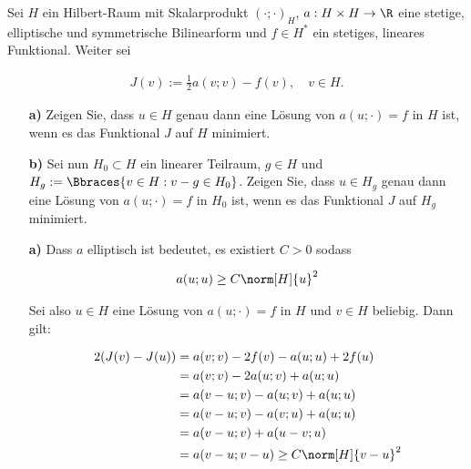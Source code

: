 
\begin{exercise}

Sei $H$ ein Hilbert-Raum mit Skalarprodukt $(\cdot;\cdot)_H$, $a : H \times H \rightarrow \R$
eine stetige, elliptische und symmetrische Bilinearform und $f \in H^*$ ein stetiges,
lineares Funktional. Weiter sei

\begin{align}
  J(v) := \frac{1}{2} a(v;v) - f(v), \quad v \in H.
\end{align}

\begin{itemize}
  \item[\textbf{a)}]
    Zeigen Sie, dass $u \in H$ genau dann eine Lösung von $a(u;\cdot) = f$ in $H$ ist,
    wenn es das Funktional $J$ auf $H$ minimiert.
  \item[\textbf{b)}]
    Sei nun $H_0 \subset H$ ein linearer Teilraum, $g \in H$ und
    $H_g := \Bbraces{v \in H: v - g \in H_0}$. Zeigen Sie, dass $u \in H_g$ genau
    dann eine Lösung von $a(u; \cdot) = f$ in $H_0$ ist, wenn es das Funktional $J$
    auf $H_g$ minimiert.
\end{itemize}
\end{exercise}


\begin{solution}

\begin{itemize}
  \item[\textbf{a)}]
  Dass $a$ elliptisch ist bedeutet, es existiert $C > 0$ sodass

  \begin{align*}
    a(u;u) \geq C \norm[H]{u}^2
  \end{align*}

  Sei also $u \in H$ eine Lösung von $a(u;\cdot) = f$ in $H$ und $v \in H$ beliebig.
  Dann gilt:

  \begin{align*}
    2(J(v) - J(u)) &=
     a(v;v) - 2f(v) - a(u;u) + 2f(u) \\
     &=
     a(v;v) -2a(u;v) + a(u;u) \\
     &=
     a(v-u;v) - a(u;v) + a(u;u) \\
     &=
     a(v-u;v) - a(v;u) + a(u;u) \\
     &=
     a(v-u;v) + a(u-v;u) \\
     &=
     a(v-u;v-u)
     \geq
     C \norm[H]{v-u}^2
  \end{align*}


\end{itemize}
\end{solution}

